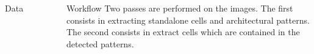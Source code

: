 \documentclass{beamer}
\begin{document}
\begin{frame}
\begin{columns}[t]
\begin{exampleblock}{Data}
\begin{figure}
\end{figure}
	
\end{exampleblock}

\begin{exampleblock}{Workflow}
Two passes are performed on the images. The first consists in extracting standalone cells and architectural patterns. The second consists in extract cells which are contained in the detected patterns. 

\begin{figure}
	\center
\end{figure}


\end{exampleblock}
\end{columns}
\end{frame}
\end{document}
